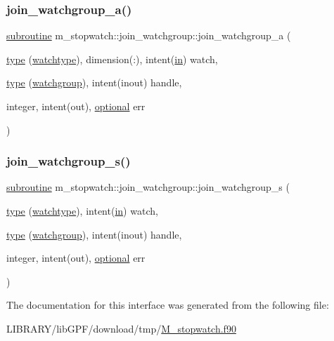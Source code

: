 \subsubsection{\texorpdfstring{join\+\_\+watchgroup\+\_\+a()}{join\_watchgroup\_a()}}
{\footnotesize\ttfamily \hyperlink{M__stopwatch_83_8txt_acfbcff50169d691ff02d4a123ed70482}{subroutine} m\+\_\+stopwatch\+::join\+\_\+watchgroup\+::join\+\_\+watchgroup\+\_\+a (\begin{DoxyParamCaption}\item[{\hyperlink{stop__watch_83_8txt_a70f0ead91c32e25323c03265aa302c1c}{type} (\hyperlink{structm__stopwatch_1_1watchtype}{watchtype}), dimension(\+:), intent(\hyperlink{M__journal_83_8txt_afce72651d1eed785a2132bee863b2f38}{in})}]{watch,  }\item[{\hyperlink{stop__watch_83_8txt_a70f0ead91c32e25323c03265aa302c1c}{type} (\hyperlink{structm__stopwatch_1_1watchgroup}{watchgroup}), intent(inout)}]{handle,  }\item[{integer, intent(out), \hyperlink{option__stopwatch_83_8txt_aa4ece75e7acf58a4843f70fe18c3ade5}{optional}}]{err }\end{DoxyParamCaption})\hspace{0.3cm}{\ttfamily [private]}}

\mbox{\label{interfacem__stopwatch_1_1join__watchgroup_a704b0809dc7432556badc54c5005cbdb}} 
\subsubsection{\texorpdfstring{join\+\_\+watchgroup\+\_\+s()}{join\_watchgroup\_s()}}
{\footnotesize\ttfamily \hyperlink{M__stopwatch_83_8txt_acfbcff50169d691ff02d4a123ed70482}{subroutine} m\+\_\+stopwatch\+::join\+\_\+watchgroup\+::join\+\_\+watchgroup\+\_\+s (\begin{DoxyParamCaption}\item[{\hyperlink{stop__watch_83_8txt_a70f0ead91c32e25323c03265aa302c1c}{type} (\hyperlink{structm__stopwatch_1_1watchtype}{watchtype}), intent(\hyperlink{M__journal_83_8txt_afce72651d1eed785a2132bee863b2f38}{in})}]{watch,  }\item[{\hyperlink{stop__watch_83_8txt_a70f0ead91c32e25323c03265aa302c1c}{type} (\hyperlink{structm__stopwatch_1_1watchgroup}{watchgroup}), intent(inout)}]{handle,  }\item[{integer, intent(out), \hyperlink{option__stopwatch_83_8txt_aa4ece75e7acf58a4843f70fe18c3ade5}{optional}}]{err }\end{DoxyParamCaption})\hspace{0.3cm}{\ttfamily [private]}}



The documentation for this interface was generated from the following file\+:\begin{DoxyCompactItemize}
\item 
L\+I\+B\+R\+A\+R\+Y/lib\+G\+P\+F/download/tmp/\hyperlink{M__stopwatch_8f90}{M\+\_\+stopwatch.\+f90}\end{DoxyCompactItemize}
